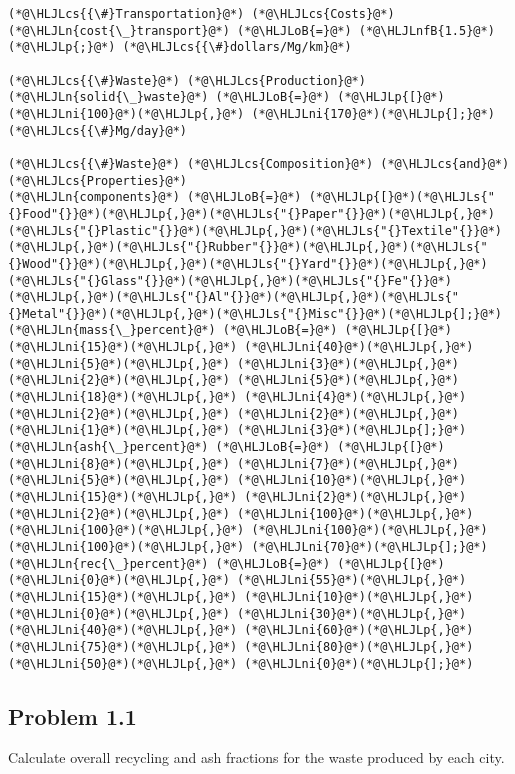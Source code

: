 \documentclass[12pt,a4paper]{article}
\newcommand{\HLJLn}[1]{#1}
\newcommand{\HLJLs}[1]{\textcolor[RGB]{201,61,57}{#1}}
\newcommand{\HLJLnfB}[1]{\textcolor[RGB]{59,151,46}{#1}}
\newcommand{\HLJLni}[1]{\textcolor[RGB]{59,151,46}{#1}}
\newcommand{\HLJLoB}[1]{\textcolor[RGB]{102,102,102}{\textbf{#1}}}
\newcommand{\HLJLp}[1]{#1}
\newcommand{\HLJLcs}[1]{\textcolor[RGB]{153,153,119}{\textit{#1}}}
\begin{document}
\begin{lstlisting}
(*@\HLJLcs{{\#}Transportation}@*) (*@\HLJLcs{Costs}@*)
(*@\HLJLn{cost{\_}transport}@*) (*@\HLJLoB{=}@*) (*@\HLJLnfB{1.5}@*)(*@\HLJLp{;}@*) (*@\HLJLcs{{\#}dollars/Mg/km}@*)

(*@\HLJLcs{{\#}Waste}@*) (*@\HLJLcs{Production}@*)
(*@\HLJLn{solid{\_}waste}@*) (*@\HLJLoB{=}@*) (*@\HLJLp{[}@*)(*@\HLJLni{100}@*)(*@\HLJLp{,}@*) (*@\HLJLni{170}@*)(*@\HLJLp{];}@*) (*@\HLJLcs{{\#}Mg/day}@*)

(*@\HLJLcs{{\#}Waste}@*) (*@\HLJLcs{Composition}@*) (*@\HLJLcs{and}@*) (*@\HLJLcs{Properties}@*)
(*@\HLJLn{components}@*) (*@\HLJLoB{=}@*) (*@\HLJLp{[}@*)(*@\HLJLs{"{}Food"{}}@*)(*@\HLJLp{,}@*)(*@\HLJLs{"{}Paper"{}}@*)(*@\HLJLp{,}@*)(*@\HLJLs{"{}Plastic"{}}@*)(*@\HLJLp{,}@*)(*@\HLJLs{"{}Textile"{}}@*)(*@\HLJLp{,}@*)(*@\HLJLs{"{}Rubber"{}}@*)(*@\HLJLp{,}@*)(*@\HLJLs{"{}Wood"{}}@*)(*@\HLJLp{,}@*)(*@\HLJLs{"{}Yard"{}}@*)(*@\HLJLp{,}@*)(*@\HLJLs{"{}Glass"{}}@*)(*@\HLJLp{,}@*)(*@\HLJLs{"{}Fe"{}}@*)(*@\HLJLp{,}@*)(*@\HLJLs{"{}Al"{}}@*)(*@\HLJLp{,}@*)(*@\HLJLs{"{}Metal"{}}@*)(*@\HLJLp{,}@*)(*@\HLJLs{"{}Misc"{}}@*)(*@\HLJLp{];}@*)
(*@\HLJLn{mass{\_}percent}@*) (*@\HLJLoB{=}@*) (*@\HLJLp{[}@*)(*@\HLJLni{15}@*)(*@\HLJLp{,}@*) (*@\HLJLni{40}@*)(*@\HLJLp{,}@*) (*@\HLJLni{5}@*)(*@\HLJLp{,}@*) (*@\HLJLni{3}@*)(*@\HLJLp{,}@*) (*@\HLJLni{2}@*)(*@\HLJLp{,}@*) (*@\HLJLni{5}@*)(*@\HLJLp{,}@*) (*@\HLJLni{18}@*)(*@\HLJLp{,}@*) (*@\HLJLni{4}@*)(*@\HLJLp{,}@*) (*@\HLJLni{2}@*)(*@\HLJLp{,}@*) (*@\HLJLni{2}@*)(*@\HLJLp{,}@*) (*@\HLJLni{1}@*)(*@\HLJLp{,}@*) (*@\HLJLni{3}@*)(*@\HLJLp{];}@*)
(*@\HLJLn{ash{\_}percent}@*) (*@\HLJLoB{=}@*) (*@\HLJLp{[}@*)(*@\HLJLni{8}@*)(*@\HLJLp{,}@*) (*@\HLJLni{7}@*)(*@\HLJLp{,}@*) (*@\HLJLni{5}@*)(*@\HLJLp{,}@*) (*@\HLJLni{10}@*)(*@\HLJLp{,}@*) (*@\HLJLni{15}@*)(*@\HLJLp{,}@*) (*@\HLJLni{2}@*)(*@\HLJLp{,}@*) (*@\HLJLni{2}@*)(*@\HLJLp{,}@*) (*@\HLJLni{100}@*)(*@\HLJLp{,}@*) (*@\HLJLni{100}@*)(*@\HLJLp{,}@*) (*@\HLJLni{100}@*)(*@\HLJLp{,}@*) (*@\HLJLni{100}@*)(*@\HLJLp{,}@*) (*@\HLJLni{70}@*)(*@\HLJLp{];}@*)
(*@\HLJLn{rec{\_}percent}@*) (*@\HLJLoB{=}@*) (*@\HLJLp{[}@*)(*@\HLJLni{0}@*)(*@\HLJLp{,}@*) (*@\HLJLni{55}@*)(*@\HLJLp{,}@*) (*@\HLJLni{15}@*)(*@\HLJLp{,}@*) (*@\HLJLni{10}@*)(*@\HLJLp{,}@*) (*@\HLJLni{0}@*)(*@\HLJLp{,}@*) (*@\HLJLni{30}@*)(*@\HLJLp{,}@*) (*@\HLJLni{40}@*)(*@\HLJLp{,}@*) (*@\HLJLni{60}@*)(*@\HLJLp{,}@*) (*@\HLJLni{75}@*)(*@\HLJLp{,}@*) (*@\HLJLni{80}@*)(*@\HLJLp{,}@*) (*@\HLJLni{50}@*)(*@\HLJLp{,}@*) (*@\HLJLni{0}@*)(*@\HLJLp{];}@*)
\end{lstlisting}


\subsection{Problem 1.1}
Calculate overall recycling and ash fractions for the waste produced by each city.
\end{document}
